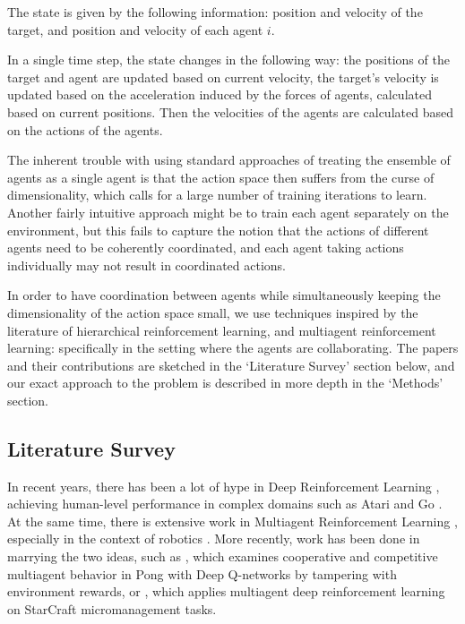 \documentclass{article}
\begin{document}
The state is given by the following information: position and velocity
of the target, and position and velocity of each agent $i$.

In a single time step, the state changes in the following way:
the positions of the target and agent are updated based on
current velocity, the target's velocity is updated
based on the acceleration induced by the forces
of agents, calculated based on current positions. Then the
velocities of the agents are calculated based on the
actions of the agents.

The inherent trouble with using standard approaches of treating
the ensemble of agents as a single agent is that the action
space then suffers from the curse of dimensionality, which
calls for a large number of training iterations to
learn. Another fairly intuitive approach might be to
train each agent separately on the environment, but
this fails to capture the notion that the actions of
different agents need to be coherently coordinated,
and each agent taking actions individually may not
result in coordinated actions.

In order to have coordination between agents while
simultaneously keeping the dimensionality
of the action space small, we use techniques inspired
by the literature of hierarchical reinforcement learning,
and multiagent reinforcement learning: specifically in
the setting where the agents are collaborating.
The papers and their contributions are sketched in
the `Literature Survey' section below, and our exact
approach to the problem is described in more depth
in the `Methods' section.


\subsection*{Literature Survey}

In recent years, there has been a lot of hype in Deep
Reinforcement Learning \cite{mnih2015human}, achieving
human-level performance in complex domains such as Atari
\cite{mnih2013playing} and Go \cite{silver2016mastering}. At
the same time, there is extensive work in Multiagent
Reinforcement Learning \cite{busoniu2008comprehensive},
especially in the context of robotics \cite{spaan2002high,
 fox2000probabilistic, mataric1997reinforcement}. More recently,
work has been done in marrying the two ideas, such as
\cite{tampuu2017multiagent}, which examines cooperative
and competitive multiagent behavior in Pong with Deep Q-networks by
tampering with environment rewards, or
\cite{usunier2016episodic, peng2017multiagent}, which applies multiagent deep
reinforcement learning on StarCraft micromanagement tasks.
\end{document}

